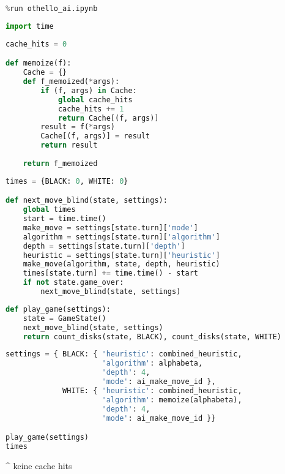 \begin{lstlisting}[language=Python]
%run othello_game.ipynb
%run othello_ai.ipynb
\end{lstlisting}

\begin{lstlisting}[language=Python]
import time
\end{lstlisting}

\begin{lstlisting}[language=Python]
cache_hits = 0

def memoize(f):
    Cache = {}
    def f_memoized(*args):
        if (f, args) in Cache:
            global cache_hits
            cache_hits += 1
            return Cache[(f, args)]
        result = f(*args)
        Cache[(f, args)] = result
        return result
    
    return f_memoized
\end{lstlisting}

\begin{lstlisting}[language=Python]
times = {BLACK: 0, WHITE: 0}

def next_move_blind(state, settings):
    global times
    start = time.time()
    make_move = settings[state.turn]['mode']
    algorithm = settings[state.turn]['algorithm']
    depth = settings[state.turn]['depth']
    heuristic = settings[state.turn]['heuristic']
    make_move(algorithm, state, depth, heuristic)
    times[state.turn] += time.time() - start
    if not state.game_over:
        next_move_blind(state, settings)
\end{lstlisting}

\begin{lstlisting}[language=Python]
def play_game(settings):
    state = GameState()
    next_move_blind(state, settings)
    return count_disks(state, BLACK), count_disks(state, WHITE)
\end{lstlisting}

\begin{lstlisting}[language=Python]
settings = { BLACK: { 'heuristic': combined_heuristic,
                      'algorithm': alphabeta,
                      'depth': 4,
                      'mode': ai_make_move_id },
             WHITE: { 'heuristic': combined_heuristic,
                      'algorithm': memoize(alphabeta),
                      'depth': 4,
                      'mode': ai_make_move_id }}

play_game(settings)
times
\end{lstlisting}

\^{} keine cache hits

